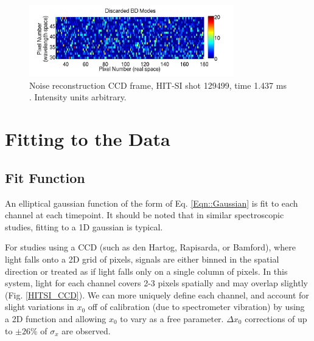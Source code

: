 \begin{center}
\begin{figure}
		\end{figure}
		\begin{figure}
			\includegraphics[width=3.5in]{BD_Discard}\caption{Noise reconstruction CCD frame, HIT-SI shot 129499, time 1.437 ms \cite{hossack2015study}. Intensity units arbitrary.}\label{BD Noise}
		\end{figure}
	\end{center}
	
	
	
	
	\section{Fitting to the Data}\label{sec:Fit}
	\subsection{Fit Function}
	An elliptical gaussian function of the form of Eq. \ref{Eqn::Gaussian} is fit to each channel at each timepoint. It should be noted that in similar spectroscopic studies, fitting to a 1D gaussian is typical. 
	For studies using a CCD (such as den Hartog\cite{den1994fast}, Rapisarda\cite{rapisarda2007role}, or Bamford\cite{bamford1992combination}), where light falls onto a 2D grid of pixels, signals are either binned in the spatial direction or treated as if light falls only on a single column of pixels. In this system, light for each channel covers 2-3 pixels spatially and may overlap slightly (Fig. \ref{HITSI_CCD}). We can more uniquely define each channel, and account for slight variations in $x_0$ off of calibration (due to spectrometer vibration) by using a 2D function and allowing $x_0$ to vary as a free parameter. $\Delta{x_0}$ corrections of up to $\pm26\%$ of $\sigma_x$ are observed.\\
	
	
